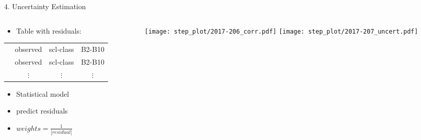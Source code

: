 \begin{frame}[t]{4. Uncertainty Estimation}
    \begin{columns}
        \begin{column}{0.45\textwidth}
            \begin{itemize}
                \item Table with residuals:
            \end{itemize}

            \scriptsize
            \begin{tabular}{| c |  c c c |}
                \hline
                \color{myred}{residuals}    & observed & scl-class & B2-B10    \\
                \color{myred}{residuals}    & observed & scl-class & B2-B10    \\
                \color{myred}{$\vdots$    } & $\vdots$ & $\vdots$  & $\vdots$ \\
            \end{tabular}\normalsize \vspace{0.5cm}

            \begin{itemize}
                \item Statistical model
                \item predict residuals
                \item $weights = \frac{1}{|residual|}$
            \end{itemize}
        \end{column}
        \begin{column}{0.42\textwidth}
            \begin{figure}
                \vspace{-1.8cm}
                \texttt{[image: step\_plot/2017-206\_corr.pdf]}
                \texttt{[image: step\_plot/2017-207\_uncert.pdf]}
            \end{figure}
        \end{column}
    \end{columns}
\end{frame}

